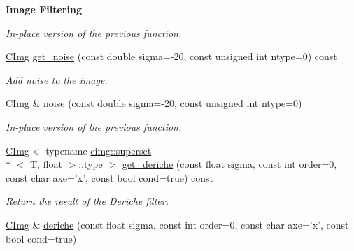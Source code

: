 \begin{Indent}{\bf Image Filtering}
\begin{DoxyCompactItemize}
\begin{DoxyCompactList}\small\item\em In-\/place version of the previous function. \end{DoxyCompactList}\item 
\hyperlink{structcimg__library_1_1_c_img}{C\-Img} \hyperlink{structcimg__library_1_1_c_img_ab47b7ed21c3ed05bd689622cd8fc6670}{get\-\_\-noise} (const double sigma=-\/20, const unsigned int ntype=0) const 
\begin{DoxyCompactList}\small\item\em Add noise to the image. \end{DoxyCompactList}\item 
\hypertarget{structcimg__library_1_1_c_img_a5f9e9fa1b27d6de91703cd57f4cf2275}{\hyperlink{structcimg__library_1_1_c_img}{C\-Img} \& \hyperlink{structcimg__library_1_1_c_img_a5f9e9fa1b27d6de91703cd57f4cf2275}{noise} (const double sigma=-\/20, const unsigned int ntype=0)}\label{structcimg__library_1_1_c_img_a5f9e9fa1b27d6de91703cd57f4cf2275}

\begin{DoxyCompactList}\small\item\em In-\/place version of the previous function. \end{DoxyCompactList}\item 
\hyperlink{structcimg__library_1_1_c_img}{C\-Img}$<$ typename \hyperlink{structcimg__library_1_1cimg_1_1superset}{cimg\-::superset}\\*
$<$ T, float $>$\-::type $>$ \hyperlink{structcimg__library_1_1_c_img_af7ea900e10d36501afaa3f79f247816e}{get\-\_\-deriche} (const float sigma, const int order=0, const char axe='x', const bool cond=true) const 
\begin{DoxyCompactList}\small\item\em Return the result of the Deriche filter. \end{DoxyCompactList}\item 
\hypertarget{structcimg__library_1_1_c_img_a01df2f3a9b1a02c244a0736b29a83356}{\hyperlink{structcimg__library_1_1_c_img}{C\-Img} \& \hyperlink{structcimg__library_1_1_c_img_a01df2f3a9b1a02c244a0736b29a83356}{deriche} (const float sigma, const int order=0, const char axe='x', const bool cond=true)}\label{structcimg__library_1_1_c_img_a01df2f3a9b1a02c244a0736b29a83356}


\end{DoxyCompactItemize}
\end{Indent}
